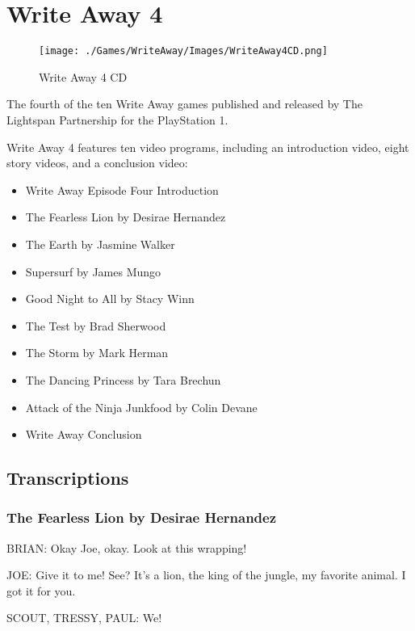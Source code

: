 \chapter{Write Away 4}

\begin{figure}[H]
    \centering
    \texttt{[image: ./Games/WriteAway/Images/WriteAway4CD.png]}
    \caption{Write Away 4 CD}
\end{figure}

The fourth of the ten Write Away games published and released by The Lightspan Partnership for the PlayStation 1.

Write Away 4 features ten video programs, including an introduction video, eight story videos, and a conclusion video:

\begin{itemize}
    \item Write Away Episode Four Introduction
    \item The Fearless Lion by Desirae Hernandez
    \item The Earth by Jasmine Walker
    \item Supersurf by James Mungo
    \item Good Night to All by Stacy Winn
    \item The Test by Brad Sherwood
    \item The Storm by Mark Herman
    \item The Dancing Princess by Tara Brechun
    \item Attack of the Ninja Junkfood by Colin Devane
    \item Write Away Conclusion
\end{itemize}

\clearpage
\newpage

\section{Transcriptions}

\subsection{The Fearless Lion by Desirae Hernandez}

BRIAN:
Okay Joe, okay.
Look at this wrapping!

JOE:
Give it to me!
See?
It's a lion, the king of the jungle, my favorite animal.
I got it for you.

SCOUT, TRESSY, PAUL:
We!

